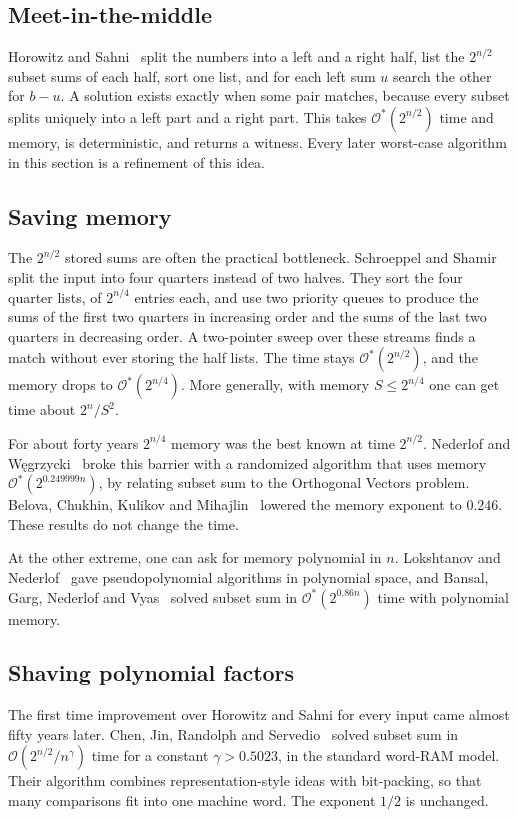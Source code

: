 \documentclass[11pt]{article}
\newcommand{\Oh}{\mathcal{O}}
\begin{document}
\subsection{Meet-in-the-middle}
Horowitz and Sahni~\cite{hs} split the numbers into a left and a right half,
list the $2^{n/2}$ subset sums of each half, sort one list, and for each left sum
$u$ search the other for $b-u$. A solution exists exactly when some pair
matches, because every subset splits uniquely into a left part and a right
part. This takes $\Oh^*(2^{n/2})$ time and memory, is deterministic, and returns
a witness. Every later worst-case algorithm in this section is a refinement of
this idea.

\subsection{Saving memory}
The $2^{n/2}$ stored sums are often the practical bottleneck. Schroeppel and
Shamir~\cite{ss} split the input into four quarters instead of two halves.
They sort the four quarter lists, of $2^{n/4}$ entries each, and use two
priority queues to produce the sums of the first two quarters in increasing
order and the sums of the last two quarters in decreasing order. A two-pointer
sweep over these streams finds a match without ever storing the half lists.
The time stays $\Oh^*(2^{n/2})$, and the memory drops to $\Oh^*(2^{n/4})$. More
generally, with memory $S\le2^{n/4}$ one can get time about $2^n/S^2$.

For about forty years $2^{n/4}$ memory was the best known at time $2^{n/2}$.
Nederlof and W\k{e}grzycki~\cite{nw} broke this barrier with a randomized
algorithm that uses memory $\Oh^*(2^{0.249999n})$, by relating subset sum to
the Orthogonal Vectors problem. Belova, Chukhin, Kulikov and
Mihajlin~\cite{bckm} lowered the memory exponent to $0.246$. These results do
not change the time.

At the other extreme, one can ask for memory polynomial in $n$. Lokshtanov and
Nederlof~\cite{ln} gave pseudopolynomial algorithms in polynomial space, and
Bansal, Garg, Nederlof and Vyas~\cite{bgnv} solved subset sum in
$\Oh^*(2^{0.86n})$ time with polynomial memory.

\subsection{Shaving polynomial factors}
The first time improvement over Horowitz and Sahni for every input came almost
fifty years later. Chen, Jin, Randolph and Servedio~\cite{chen} solved subset
sum in $\Oh(2^{n/2}/n^{\gamma})$ time for a constant $\gamma>0.5023$, in the
standard word-RAM model. Their algorithm combines representation-style ideas
with bit-packing, so that many comparisons fit into one machine word. The
exponent $1/2$ is unchanged.
\end{document}
